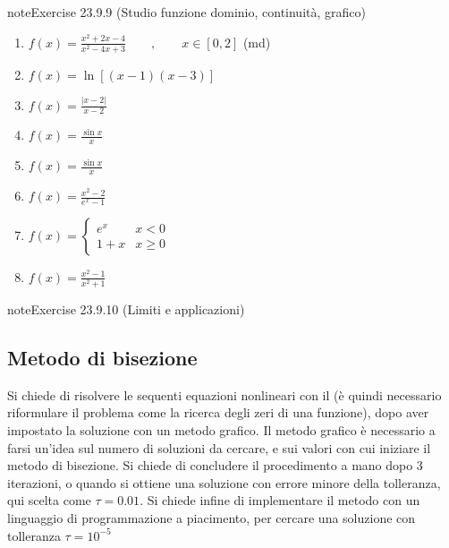 \documentclass[letterpaper,10pt,italian]{jupyterBook}
\begin{document}
\begin{sphinxadmonition}{note}{Exercise 23.9.9 (Studio funzione \sphinxhyphen{} dominio, continuità, grafico)}
\begin{enumerate}
\item {} 
\sphinxAtStartPar
\(f(x) = \frac{x^2+2x-4}{x^2-4x+3} \qquad , \qquad x \in [0,2]\) (md)

\item {} 
\sphinxAtStartPar
\(f(x) = \ln \left[(x-1)(x-3)\right] \)

\item {} 
\sphinxAtStartPar
\(f(x) = \frac{|x-2|}{x-2}\)

\item {} 
\sphinxAtStartPar
\(f(x) = \frac{\sin x}{x}\)

\item {} 
\sphinxAtStartPar
\(f(x) = \frac{\sin x}{x}\)

\item {} 
\sphinxAtStartPar
\(f(x) = \frac{x^2 - 2}{e^x-1}\)

\item {} 
\sphinxAtStartPar
\(f(x) = \begin{cases} e^x & x < 0 \\ 1 + x  & x \ge 0 \end{cases}\)

\item {} 
\sphinxAtStartPar
\(f(x) = \frac{x^2 - 1}{x^2 + 1}\)

\end{enumerate}
\end{sphinxadmonition}
 \label{exercise:ch/infinitesimal_calculus/analysis-problems-exercise-9}

\begin{sphinxadmonition}{note}{Exercise 23.9.10 (Limiti e applicazioni)}




\end{sphinxadmonition}


\subsection{Metodo di bisezione}
\label{\detokenize{ch/infinitesimal_calculus/analysis-problems:metodo-di-bisezione}}
\sphinxAtStartPar
Si chiede di risolvere le sequenti equazioni nonlineari con il {\hyperref[\detokenize{ch/infinitesimal_calculus/analysis:infinitesimal-calculus-continuous-fun-bisec}]{}} (è quindi necessario riformulare il problema come la ricerca degli zeri di una funzione), dopo aver impostato la soluzione con un metodo grafico. Il metodo grafico è necessario a farsi un’idea sul numero di soluzioni da cercare, e sui valori con cui iniziare il metodo di bisezione. Si chiede di concludere il procedimento a mano dopo 3 iterazioni, o quando si ottiene una soluzione con errore minore della tolleranza, qui scelta come \(\tau = 0.01\). Si chiede infine di implementare il metodo con un linguaggio di programmazione a piacimento, per cercare una soluzione con tolleranza \(\tau = 10^{-5}\)
 \label{exercise:ch/infinitesimal_calculus/analysis-problems-exercise-10}
\end{document}
